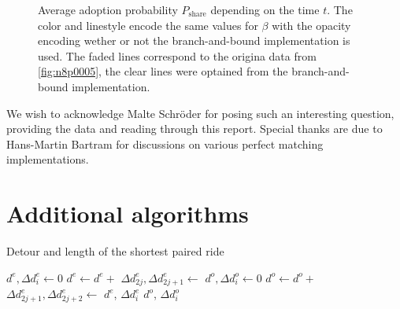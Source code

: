 \documentclass[aps,pra,showpacs,preprintnumbers,amsmath,amssymb,nofootinbib]{revtex4-2}
\begin{document}
\begin{figure}[hbt]
        \caption{Average adoption probability $P_{\mathrm{share}}$ depending on the time $t$. 
        The color and linestyle encode the same values for $\beta$ with the opacity encoding wether or not the branch-and-bound implementation is used. 
        The faded lines correspond to the origina data from \cref{fig:n8p0005}, the clear lines were optained from the branch-and-bound implementation.}
        \label{fig:branchandbound}
    \end{figure}

    \begin{acknowledgments}
        We wish to acknowledge Malte Schröder for posing such an interesting question, providing the data and reading through this report. 
        Special thanks are due to Hans-Martin Bartram for discussions on various perfect matching implementations.
    \end{acknowledgments}

    \appendix
    
    \section{Additional algorithms}
    \begin{algorithm}[H]
        \caption{Detour and length of the shortest paired ride}
        \label{alg:shortest_paired_ride_detour}
        \begin{algorithmic}[1]
                \State $d^e, \Delta d^e_i \leftarrow 0$ 
                    \State $d^e \leftarrow d^e + $
                    \State $\Delta d^e_{2j}, \Delta d^e_{2j+1} \leftarrow$
                \EndFor
                \State $d^o, \Delta d^o_i \leftarrow 0$ 
                    \State $d^o \leftarrow d^o + $
                    \State $\Delta d^e_{2j + 1}, \Delta d^e_{2j+2} \leftarrow$
                \EndFor
                \State \Return $d^e$, $\Delta d^e_i$
                \Else
                \State \Return $d^o$, $\Delta d^o_i$
                \EndIf
            \EndProcedure
        \end{algorithmic}
    \end{algorithm}
\end{document}
